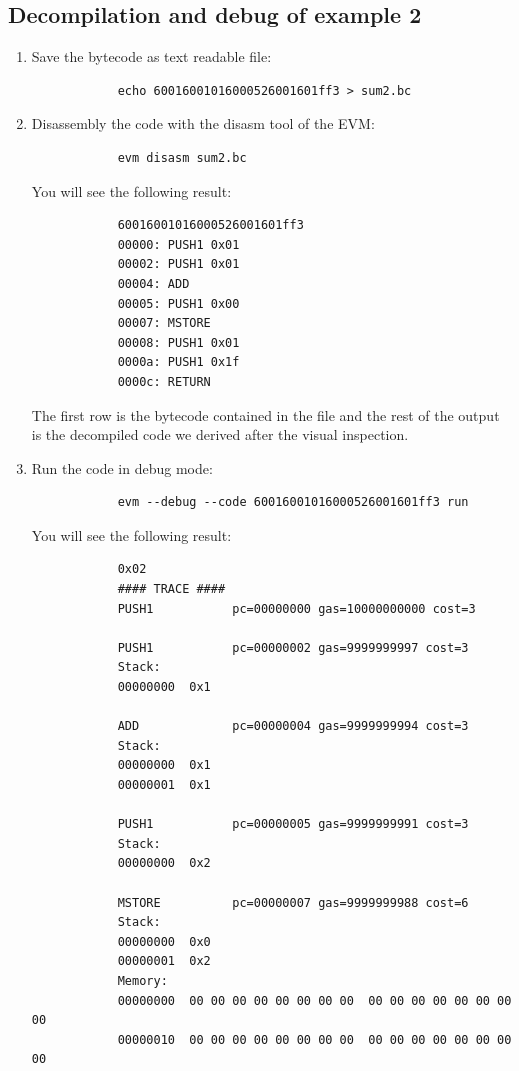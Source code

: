\documentclass{scrbook}
\begin{document}
\subsection{Decompilation and debug of example 2}

\begin{enumerate}
    \item
        Save the bytecode as text readable file:
        \begin{lstlisting}
            echo 60016001016000526001601ff3 > sum2.bc
        \end{lstlisting}

    \item
        Disassembly the code with the disasm tool of the EVM:
        \begin{lstlisting}
            evm disasm sum2.bc
        \end{lstlisting}
        You will see the following result:
        \begin{lstlisting}
            60016001016000526001601ff3
            00000: PUSH1 0x01
            00002: PUSH1 0x01
            00004: ADD
            00005: PUSH1 0x00
            00007: MSTORE
            00008: PUSH1 0x01
            0000a: PUSH1 0x1f
            0000c: RETURN
        \end{lstlisting}
        The first row is the bytecode contained in the file and the rest of the output is the decompiled code we derived after the visual inspection.

    \item 
        Run the code in debug mode:
        \begin{lstlisting}
            evm --debug --code 60016001016000526001601ff3 run
        \end{lstlisting}
        You will see the following result:
        \begin{lstlisting}
            0x02
            #### TRACE ####
            PUSH1           pc=00000000 gas=10000000000 cost=3
            
            PUSH1           pc=00000002 gas=9999999997 cost=3
            Stack:
            00000000  0x1
            
            ADD             pc=00000004 gas=9999999994 cost=3
            Stack:
            00000000  0x1
            00000001  0x1
            
            PUSH1           pc=00000005 gas=9999999991 cost=3
            Stack:
            00000000  0x2
            
            MSTORE          pc=00000007 gas=9999999988 cost=6
            Stack:
            00000000  0x0
            00000001  0x2
            Memory:
            00000000  00 00 00 00 00 00 00 00  00 00 00 00 00 00 00 00
            00000010  00 00 00 00 00 00 00 00  00 00 00 00 00 00 00 00
            

\end{lstlisting}
\end{enumerate}
\end{document}
